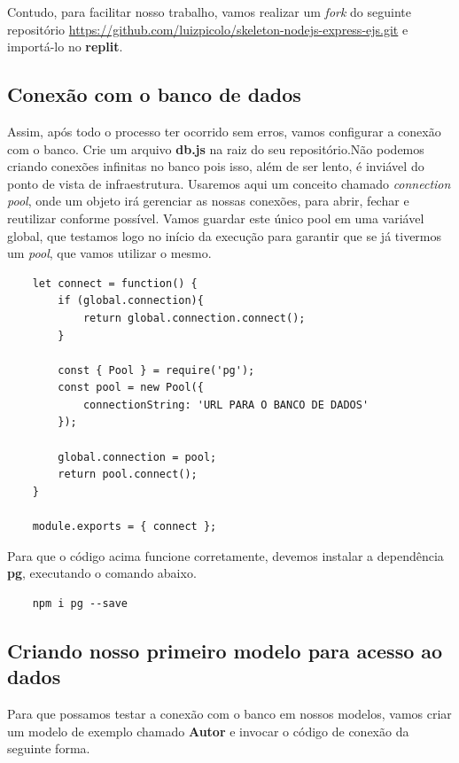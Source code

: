 Contudo, para facilitar nosso trabalho, vamos realizar um \textit{fork} do seguinte repositório \url{https://github.com/luizpicolo/skeleton-nodejs-express-ejs.git} e importá-lo no \textbf{replit}.

\subsection{Conexão com o banco de dados}

Assim, após todo o processo ter ocorrido sem erros, vamos configurar a conexão com o banco. Crie um arquivo \textbf{db.js} na raiz do seu repositório.Não podemos criando conexões infinitas no banco pois isso, além de ser lento, é inviável do ponto de vista de infraestrutura. Usaremos aqui um conceito chamado \textit{connection pool}, onde um objeto irá gerenciar as nossas conexões, para abrir, fechar e reutilizar conforme possível. Vamos guardar este único pool em uma variável global, que testamos logo no início da execução para garantir que se já tivermos um \textit{pool}, que vamos utilizar o mesmo.


\begin{verbatim}
	let connect = function() {
		if (global.connection){
			return global.connection.connect();
		}
		
		const { Pool } = require('pg');
		const pool = new Pool({
			connectionString: 'URL PARA O BANCO DE DADOS'
		});
		
		global.connection = pool;
		return pool.connect();
	}
	
	module.exports = { connect };
\end{verbatim}

Para que o código acima funcione corretamente, devemos instalar a dependência \textbf{pg}, executando o comando abaixo. 

\begin{verbatim}
	npm i pg --save	
\end{verbatim}

\subsection{Criando nosso primeiro modelo para acesso ao dados}

Para que possamos testar a conexão com o banco em nossos modelos, vamos criar um modelo de exemplo chamado \textbf{Autor} e invocar o código de conexão da seguinte forma.

